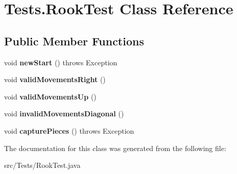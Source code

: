 \hypertarget{class_tests_1_1_rook_test}{}\section{Tests.\+Rook\+Test Class Reference}
\label{class_tests_1_1_rook_test}
\subsection*{Public Member Functions}
\begin{DoxyCompactItemize}
\item 
\mbox{\label{class_tests_1_1_rook_test_aa0689fccf73fbb78214f6685cca09687}} 
void {\bfseries new\+Start} ()  throws Exception
\item 
\mbox{\label{class_tests_1_1_rook_test_a14906a143a65e096bc060716325b06a9}} 
void {\bfseries valid\+Movements\+Right} ()
\item 
\mbox{\label{class_tests_1_1_rook_test_a1b97b4ac991136ca0d616e9a7224381e}} 
void {\bfseries valid\+Movements\+Up} ()
\item 
\mbox{\label{class_tests_1_1_rook_test_aefff3f4e857073c54c97cb04a0248dc5}} 
void {\bfseries invalid\+Movements\+Diagonal} ()
\item 
\mbox{\label{class_tests_1_1_rook_test_a1a12e20c64eeb9c5f2d3e4fc5e8bb45c}} 
void {\bfseries capture\+Pieces} ()  throws Exception 
\end{DoxyCompactItemize}


The documentation for this class was generated from the following file\+:\begin{DoxyCompactItemize}
\item 
src/\+Tests/Rook\+Test.\+java\end{DoxyCompactItemize}
